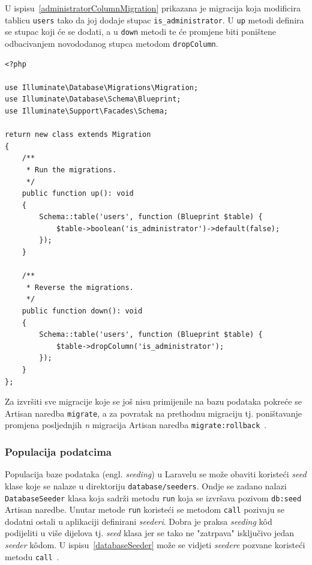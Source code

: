 U ispisu~\ref{administratorColumnMigration} prikazana je migracija koja modificira tablicu \texttt{users} tako da joj dodaje stupac \texttt{is\_administrator}. U \texttt{up} metodi definira se stupac koji će se dodati, a u \texttt{down} metodi te će promjene biti poništene odbacivanjem novododanog stupca metodom \texttt{dropColumn}.

\begin{lstlisting}[caption={Migracija za dodavanje stupca \texttt{is\_administrator} u tablicu \texttt{users}}, label=administratorColumnMigration]
<?php

use Illuminate\Database\Migrations\Migration;
use Illuminate\Database\Schema\Blueprint;
use Illuminate\Support\Facades\Schema;

return new class extends Migration
{
    /**
     * Run the migrations.
     */
    public function up(): void
    {
        Schema::table('users', function (Blueprint $table) {
            $table->boolean('is_administrator')->default(false);
        });
    }

    /**
     * Reverse the migrations.
     */
    public function down(): void
    {
        Schema::table('users', function (Blueprint $table) {
            $table->dropColumn('is_administrator');
        });
    }
};

\end{lstlisting}

Za izvršiti sve migracije koje se još nisu primijenile na bazu podataka pokreće se Artisan naredba \texttt{migrate}, a za povratak na prethodnu migraciju tj. poništavanje promjena posljednjih \textit{n} migracija Artisan naredba \texttt{migrate:rollback}~\cite{migrations}.

\subsubsection{Populacija podatcima}
Populacija baze podataka (engl. \textit{seeding}) u Laravelu se može obaviti koristeći \textit{seed} klase koje se nalaze u direktoriju \texttt{database/seeders}. Ondje se zadano nalazi \\ \texttt{DatabaseSeeder} klasa koja sadrži metodu \texttt{run} koja se izvršava pozivom \texttt{db:seed} Artisan naredbe. Unutar metode \texttt{run} koristeći se metodom \texttt{call} pozivaju se dodatni ostali u aplikaciji definirani \textit{seederi}. Dobra je praksa \textit{seeding} k\^od podijeliti u više dijelova tj. \textit{seed} klasa jer se tako ne "zatrpava" isključivo jedan \textit{seeder} k\^odom. U ispisu~\ref{databaseSeeder} može se vidjeti \textit{seedere} pozvane koristeći metodu \texttt{call}~\cite{seeding}.

